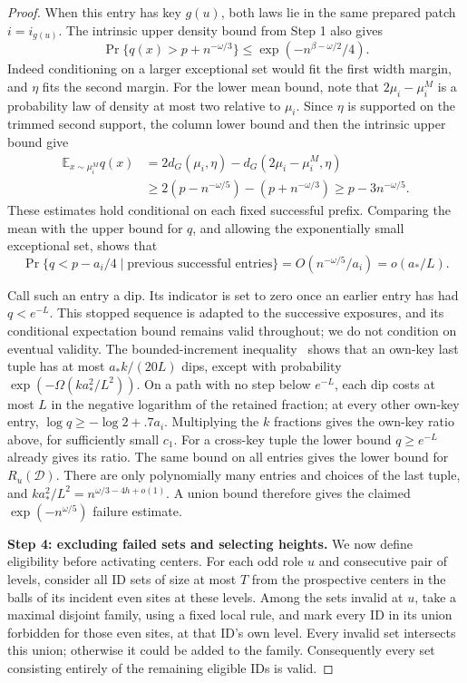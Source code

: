 \begin{proof}
When this entry has key \(g(u)\), both laws lie in the same prepared
patch \(i=i_{g(u)}\). The intrinsic upper density bound from Step 1 also
gives
\[
 \Pr\{q(x)>p+n^{-\omega/3}\}
       \le\exp(-n^{\beta-\omega/2}/4).
\]
Indeed conditioning on a larger exceptional set would fit the first
width margin, and \(\eta\) fits the second margin. For the lower mean
bound, note that \(2\mu_i-\mu_i^M\) is a probability law of density at
most two relative to \(\mu_i\). Since \(\eta\) is supported on the
trimmed second support, the column lower bound and then the intrinsic
upper bound give
\[
 \begin{aligned}
 \mathbb E_{x\sim\mu_i^M}q(x)
 &=2d_G(\mu_i,\eta)-d_G(2\mu_i-\mu_i^M,\eta)\\
 &\ge2(p-n^{-\omega/5})-(p+n^{-\omega/3})
 \ge p-3n^{-\omega/5}.
 \end{aligned}
\]
These estimates hold conditional on each fixed successful prefix.
Comparing the mean with the upper bound for \(q\), and allowing the
exponentially small exceptional set, shows that
\[
 \Pr\{q<p-a_i/4\mid\text{previous successful entries}\}
       =O(n^{-\omega/5}/a_i)=o(a_*/L).
\]

Call such an entry a dip. Its indicator is set to zero once an earlier
entry has had \(q<e^{-L}\). This stopped sequence is adapted to the
successive exposures, and its conditional expectation bound remains
valid throughout; we do not condition on eventual validity. The bounded-increment
inequality~\cite{azuma1967} shows that an own-key last tuple has at most
\(a_*k/(20L)\) dips, except with probability
\(\exp(-\Omega(ka_*^2/L^2))\). On a path with no step below \(e^{-L}\),
each dip costs at most \(L\) in the negative logarithm of the retained
fraction; at every other own-key entry,
\(\log q\ge-\log2+.7a_i\). Multiplying the \(k\) fractions gives the
own-key ratio above, for sufficiently small \(c_1\). For a cross-key
tuple the lower bound \(q\ge e^{-L}\) already gives its ratio. The same
bound on all entries gives the lower bound for \(R_u(\mathcal D)\).
There are only polynomially many entries and choices of the last tuple,
and \(ka_*^2/L^2=n^{\omega/3-4h+o(1)}\). A union bound therefore gives
the claimed \(\exp(-n^{\omega/5})\) failure estimate.

\noindent\textbf{Step 4: excluding failed sets and selecting heights.}\quad
We now define eligibility before activating centers. For each odd role
\(u\) and consecutive pair of levels, consider all ID sets of size at
most \(T\) from the prospective centers in the balls of its incident
even sites at these levels. Among the sets invalid at \(u\), take a
maximal disjoint family, using a fixed local rule, and mark every ID in
its union forbidden for those even sites, at that ID's own level. Every
invalid set intersects this union; otherwise it could be added to the
family. Consequently every set consisting entirely of the remaining
eligible IDs is valid.


\end{proof}
